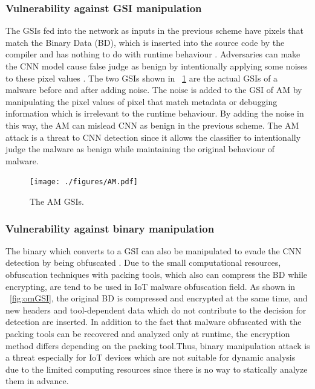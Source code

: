 \documentclass{ieeeaccess}
\begin{document}
\subsubsection{Vulnerability against GSI manipulation}
The GSIs fed into the network as inputs in the previous scheme have pixels that match the Binary Data (BD), which is inserted into the source code by the compiler and has nothing to do with runtime behaviour \cite{am}.
Adversaries can make the CNN model cause false judge as benign by intentionally applying some noises to these pixel values \cite{am}.
The two GSIs shown in \figurename~\ref{fig:amGSI} are the actual GSIs of a malware before and after adding noise.
The noise is added to the GSI of AM by manipulating the pixel values of pixel that match metadata or debugging information which is irrelevant to the runtime behaviour.
By adding the noise in this way, the AM can mislead CNN as benign in the previous scheme.
The AM attack is a threat to CNN detection since it allows the classifier to intentionally judge the malware as benign while maintaining the original behaviour of malware.

\begin{figure}[h]
 \centering
 \texttt{[image: ./figures/AM.pdf]}
 \caption{The AM GSIs.} 
 \label{fig:amGSI}
\end{figure}
\subsubsection{Vulnerability against binary manipulation}
The binary which converts to a GSI can also be manipulated to evade the CNN detection by being obfuscated \cite{om}.
Due to the small computational resources, obfuscation techniques with packing tools, which also can compress the BD while encrypting, are tend to be used in IoT malware obfuscation field.
As shown in \figurename~\ref{fig:omGSI}, the original BD is compressed and encrypted at the same time, and new headers and tool-dependent data which do not contribute to the decision for detection are inserted.
In addition to the fact that malware obfuscated with the packing tools can be recovered and analyzed only at runtime, the encryption method differs depending on the packing tool.Thus, binary manipulation attack is a threat especially for IoT devices which are not suitable for dynamic analysis due to the limited computing resources since there is no way to statically analyze them in advance.
\end{document}
